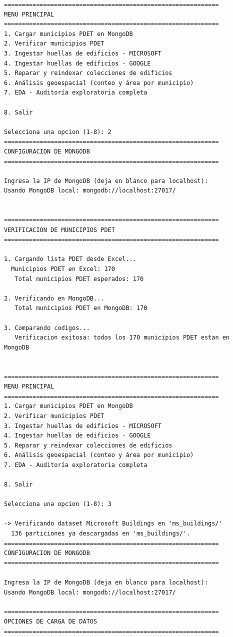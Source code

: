 \documentclass[12pt,a4paper]{article}
\begin{document}
\begin{lstlisting}[style=evidence]
============================================================
MENU PRINCIPAL
============================================================
1. Cargar municipios PDET en MongoDB
2. Verificar municipios PDET
3. Ingestar huellas de edificios - MICROSOFT
4. Ingestar huellas de edificios - GOOGLE
5. Reparar y reindexar colecciones de edificios
6. Análisis geoespacial (conteo y área por municipio)
7. EDA - Auditoría exploratoria completa

8. Salir

Selecciona una opcion (1-8): 2
============================================================
CONFIGURACION DE MONGODB
============================================================

Ingresa la IP de MongoDB (deja en blanco para localhost): 
Usando MongoDB local: mongodb://localhost:27017/


============================================================
VERIFICACION DE MUNICIPIOS PDET
============================================================

1. Cargando lista PDET desde Excel...
  Municipios PDET en Excel: 170
   Total municipios PDET esperados: 170

2. Verificando en MongoDB...
   Total municipios PDET en MongoDB: 170

3. Comparando codigos...
   Verificacion exitosa: todos los 170 municipios PDET estan en MongoDB


============================================================
MENU PRINCIPAL
============================================================
1. Cargar municipios PDET en MongoDB
2. Verificar municipios PDET
3. Ingestar huellas de edificios - MICROSOFT
4. Ingestar huellas de edificios - GOOGLE
5. Reparar y reindexar colecciones de edificios
6. Análisis geoespacial (conteo y área por municipio)
7. EDA - Auditoría exploratoria completa

8. Salir

Selecciona una opcion (1-8): 3

-> Verificando dataset Microsoft Buildings en 'ms_buildings/'
  136 particiones ya descargadas en 'ms_buildings/'.
============================================================
CONFIGURACION DE MONGODB
============================================================

Ingresa la IP de MongoDB (deja en blanco para localhost): 
Usando MongoDB local: mongodb://localhost:27017/

============================================================
OPCIONES DE CARGA DE DATOS
============================================================


\end{lstlisting}
\end{document}
